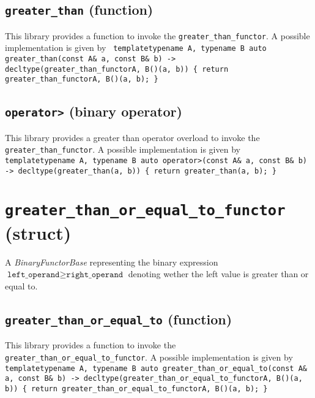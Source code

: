 \documentclass[oneside]{book}
\begin{document}
\subsection{\texttt{greater\_than} (function)}
This library provides a function to invoke the \texttt{greater\_than\_functor}.
A possible implementation is given by\newline
\texttt{
template\textlangle typename A, typename B\textrangle\newline
auto greater\_than(const A\& a, const B\& b)\newline
-> decltype(greater\_than\_functor\textlangle A, B\textrangle()(a, b))\newline
\{ return greater\_than\_functor\textlangle A, B\textrangle()(a, b); \}
}

\subsection{\texttt{operator>} (binary operator)}
This library provides a greater than operator overload to invoke the \texttt{greater\_than\_functor}.
A possible implementation is given by\newline
\texttt{
template\textlangle typename A, typename B\textrangle\newline
auto operator>(const A\& a, const B\& b)\newline
-> decltype(greater\_than(a, b))\newline
\{ return greater\_than(a, b); \}
}

\section{\texttt{greater\_than\_or\_equal\_to\_functor} (struct)}
A \textit{BinaryFunctorBase} representing the binary expression
$\texttt{left\_operand} \geq \texttt{right\_operand}$
denoting wether the left value is greater than or equal to.\newline

\subsection{\texttt{greater\_than\_or\_equal\_to} (function)}
This library provides a function to invoke the \texttt{greater\_than\_or\_equal\_to\_functor}.
A possible implementation is given by\newline
\texttt{
template\textlangle typename A, typename B\textrangle\newline
auto greater\_than\_or\_equal\_to(const A\& a, const B\& b)\newline
-> decltype(greater\_than\_or\_equal\_to\_functor\textlangle A, B\textrangle()(a, b))\newline
\{ return greater\_than\_or\_equal\_to\_functor\textlangle A, B\textrangle()(a, b); \}
}
\end{document}
